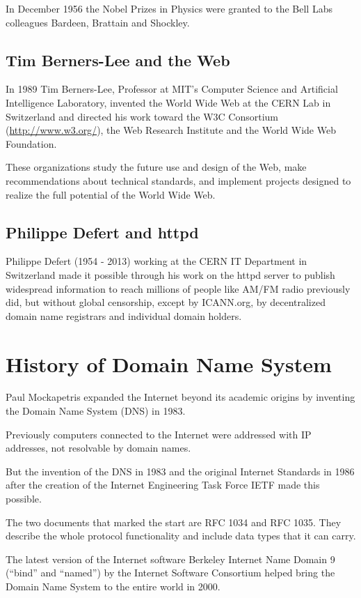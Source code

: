 \documentclass[UKenglish]{ifimaster}  %
\begin{document}
In December 1956 the Nobel Prizes in Physics were granted to the Bell Labs colleagues Bardeen, Brattain and Shockley.

\subsection{Tim Berners-Lee and the Web}

In 1989 Tim Berners-Lee, Professor at MIT's Computer Science and
Artificial Intelligence Laboratory, invented the World Wide Web
at the CERN Lab in Switzerland and directed his work toward the
W3C Consortium (\url{http://www.w3.org/}), the Web Research Institute
and the World Wide Web Foundation.

These organizations study the future use and design of the Web, make
recommendations about technical standards, and implement projects
designed to realize the full potential of the World Wide Web.

\subsection{Philippe Defert and httpd}

Philippe Defert (1954 - 2013) working at the CERN IT Department in
Switzerland made it possible through his work on the httpd server to
publish widespread information to reach millions of people like AM/FM
radio previously did, but without global censorship, except by
ICANN.org, by decentralized domain name registrars and individual
domain holders.

\section{History of Domain Name System}

Paul Mockapetris expanded the Internet beyond its academic origins
by inventing the Domain Name System (DNS) in 1983.
 
Previously computers connected to the Internet were addressed with
IP addresses, not resolvable by domain names.

But the invention of the DNS in 1983 and the original Internet
Standards in 1986 after the creation of the Internet Engineering Task
Force IETF made this possible.

The two documents that marked the start are RFC 1034 and RFC
1035. They describe the whole protocol functionality and include data
types that it can carry.

The latest version of the Internet software Berkeley Internet Name
Domain 9 (``bind'' and ``named'') by the Internet Software Consortium
helped bring the Domain Name System to the entire world in 2000.
\end{document}
